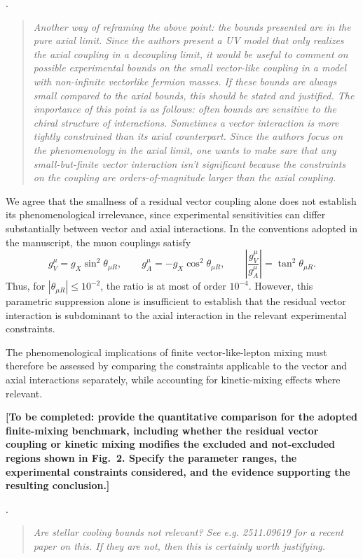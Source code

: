 \documentclass[12pt,a4paper]{article}
\begin{document}
\medskip
{}.
\begin{quote}\itshape
Another way of reframing the above point: the bounds presented are in the pure axial limit. Since the authors present a UV model that only realizes the axial coupling in a decoupling limit, it would be useful to comment on possible experimental bounds on the small vector-like coupling in a model with non-infinite vectorlike fermion masses. If these bounds are always small compared to the axial bounds, this should be stated and justified. The importance of this point is as follows: often bounds are sensitive to the chiral structure of interactions. Sometimes a vector interaction is more tightly constrained than its axial counterpart. Since the authors focus on the phenomenology in the axial limit, one wants to make sure that any small-but-finite vector interaction isn't significant because the constraints on the coupling are orders-of-magnitude larger than the axial coupling.
\end{quote}


We agree that the smallness of a residual vector coupling alone does not establish its phenomenological irrelevance, since experimental sensitivities can differ substantially between vector and axial interactions. In the conventions adopted in the manuscript, the muon couplings satisfy
\[
g_V^\mu=g_X\sin^2\theta_{\mu R},\qquad
g_A^\mu=-g_X\cos^2\theta_{\mu R},
\qquad
\left|\frac{g_V^\mu}{g_A^\mu}\right|
=\tan^2\theta_{\mu R}.
\]
Thus, for \(|\theta_{\mu R}|\leq10^{-2}\), the ratio is at most of order \(10^{-4}\). However, this parametric suppression alone is insufficient to establish that the residual vector interaction is subdominant to the axial interaction in the relevant experimental constraints.

The phenomenological implications of finite vector-like-lepton mixing must therefore be assessed by comparing the constraints applicable to the vector and axial interactions separately, while accounting for kinetic-mixing effects where relevant.

\textbf{[To be completed: provide the quantitative comparison for the adopted finite-mixing benchmark, including whether the residual vector coupling or kinetic mixing modifies the excluded and not-excluded regions shown in Fig.~2. Specify the parameter ranges, the experimental constraints considered, and the evidence supporting the resulting conclusion.]}

\medskip
{}.
\begin{quote}\itshape
Are stellar cooling bounds not relevant? See e.g. 2511.09619 for a recent paper on this. If they are not, then this is certainly worth justifying.
\end{quote}
\end{document}
